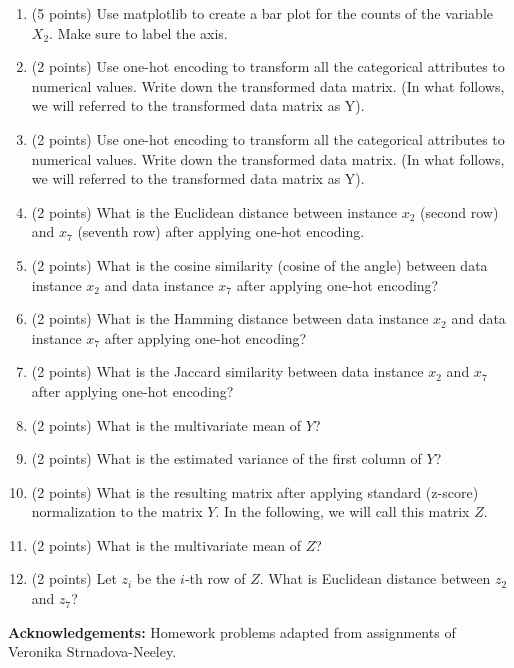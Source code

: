 \documentclass[11pt]{article}
\begin{document}
\begin{enumerate}
    \item (5 points) Use matplotlib to create a bar plot for the counts of the
    variable $X_2$.  Make sure to label the axis.

    \item (2 points) Use one-hot encoding to transform all the categorical
    attributes to numerical values.  Write down the transformed data matrix. (In
    what follows, we will referred to the transformed data matrix as Y).

    \item (2 points) Use one-hot encoding to transform all the categorical
    attributes to numerical values.  Write down the transformed data matrix. (In
    what follows, we will referred to the transformed data matrix as Y).

    \item (2 points) What is the Euclidean distance between instance $x_2$
    (second row) and $x_7$ (seventh row) after applying one-hot encoding.

    \item (2 points) What is the cosine similarity (cosine of the angle)
    between data instance $x_2$ and data instance $x_7$ after applying one-hot
    encoding?

    \item (2 points) What is the Hamming distance between data instance $x_2$
    and data instance $x_7$ after applying one-hot encoding?

    \item (2 points) What is the Jaccard similarity between data instance $x_2$
    and $x_7$ after applying one-hot encoding?


    \item (2 points) What is the multivariate mean of $Y$?


    \item (2 points) What is the estimated variance of the first column of $Y$?

    \item (2 points) What is the resulting matrix after applying standard
    (z-score) normalization to the matrix $Y$.  In the following, we will call
    this matrix $Z$.

    \item (2 points) What is the multivariate mean of $Z$?

    \item (2 points) Let $z_i$ be the $i$-th row of $Z$.  What is Euclidean
    distance between $z_2$ and $z_7$?

\end{enumerate}

{\bf Acknowledgements:} Homework problems adapted from assignments of
Veronika Strnadova-Neeley.
\end{document}
